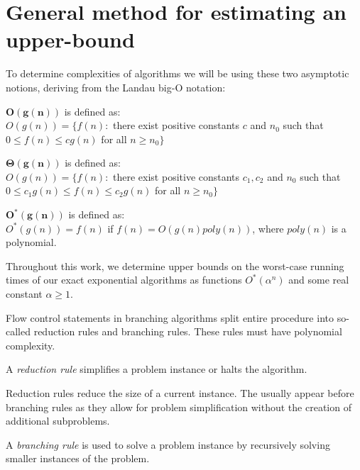\section{General method for estimating an upper-bound}

To determine complexities of algorithms we will be using these two asymptotic notions, deriving from the Landau big-O notation:
\begin{defn}[Big $O$]
$\boldsymbol{O(g(n))}$ is defined as: \\
$O(g(n)) = \{ f (n) \colon$ there exist positive constants $c$ and $n_0$ such that
$0 \leq f (n) \leq cg(n)$ for all $n \geq n_0\}$
\end{defn}

\begin{defn}
$\boldsymbol{\Theta(g(n))}$ is defined as: \\
$O(g(n)) = \{ f (n) \colon$ there exist positive constants $c_1, c_2$ and $n_0$ such that
$0 \leq c_1 g(n) \leq f (n) \leq c_2 g(n)$ for all $n \geq n_0\}$
\end{defn}

\begin{defn}[Big $O^*$]
$\boldsymbol{O^*(g(n))}$ is defined as: \\
$O^*(g(n)) = f(n)$ if $f(n) = O(g(n)poly(n))$, where $poly(n)$ is a polynomial.
\end{defn}

Throughout this work, we determine upper bounds on the worst-case running times of our exact exponential algorithms as functions $O^*(\alpha^n)$ and some real constant $\alpha \geq 1$. 

Flow control statements in branching algorithms split entire procedure into so-called reduction rules and branching rules. These rules must have polynomial complexity.

\begin{defn}
A \emph{reduction rule} simplifies a problem instance or halts the algorithm.
\end{defn}
Reduction rules reduce the size of a current instance. The usually appear before branching rules as they allow for problem simplification without the creation of additional subproblems.

\begin{defn}
A \emph{branching rule} is used to solve a problem instance by recursively solving smaller instances of the problem.
\end{defn}

